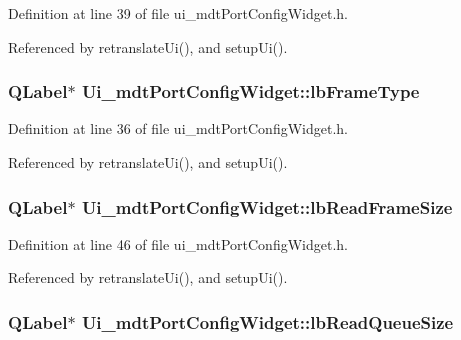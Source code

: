 Definition at line 39 of file ui\-\_\-mdt\-Port\-Config\-Widget.\-h.



Referenced by retranslate\-Ui(), and setup\-Ui().

\hypertarget{class_ui__mdt_port_config_widget_aeae3047fddb41727e04fc3e6bfdc927a}{
\subsubsection[{lb\-Frame\-Type}]{\setlength{\rightskip}{0pt plus 5cm}Q\-Label$\ast$ Ui\-\_\-mdt\-Port\-Config\-Widget\-::lb\-Frame\-Type}}\label{class_ui__mdt_port_config_widget_aeae3047fddb41727e04fc3e6bfdc927a}


Definition at line 36 of file ui\-\_\-mdt\-Port\-Config\-Widget.\-h.



Referenced by retranslate\-Ui(), and setup\-Ui().

\hypertarget{class_ui__mdt_port_config_widget_a73d82c7cfbd664ac2d81866000cb4f8d}{
\subsubsection[{lb\-Read\-Frame\-Size}]{\setlength{\rightskip}{0pt plus 5cm}Q\-Label$\ast$ Ui\-\_\-mdt\-Port\-Config\-Widget\-::lb\-Read\-Frame\-Size}}\label{class_ui__mdt_port_config_widget_a73d82c7cfbd664ac2d81866000cb4f8d}


Definition at line 46 of file ui\-\_\-mdt\-Port\-Config\-Widget.\-h.



Referenced by retranslate\-Ui(), and setup\-Ui().

\hypertarget{class_ui__mdt_port_config_widget_a78d9233108a570f4572c1b3fd9d22158}{
\subsubsection[{lb\-Read\-Queue\-Size}]{\setlength{\rightskip}{0pt plus 5cm}Q\-Label$\ast$ Ui\-\_\-mdt\-Port\-Config\-Widget\-::lb\-Read\-Queue\-Size}}\label{class_ui__mdt_port_config_widget_a78d9233108a570f4572c1b3fd9d22158}


